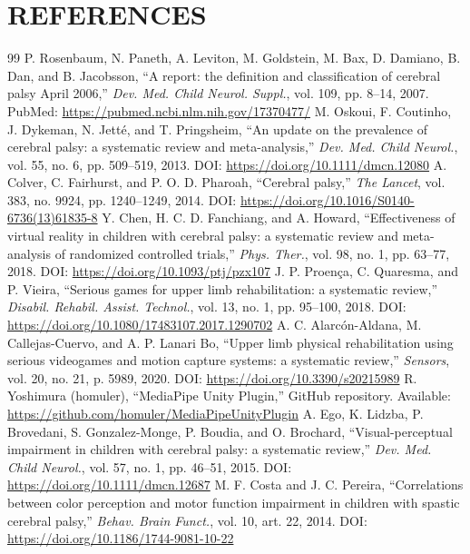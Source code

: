 \documentclass[12pt]{article}
\begin{document}
\clearpage
\section{REFERENCES}
\begin{thebibliography}{99}
 P. Rosenbaum, N. Paneth, A. Leviton, M. Goldstein, M. Bax, D. Damiano, B. Dan, and B. Jacobsson, ``A report: the definition and classification of cerebral palsy April 2006,'' \textit{Dev. Med. Child Neurol. Suppl.}, vol. 109, pp. 8--14, 2007. PubMed: \url{https://pubmed.ncbi.nlm.nih.gov/17370477/}
 M. Oskoui, F. Coutinho, J. Dykeman, N. Jett\'e, and T. Pringsheim, ``An update on the prevalence of cerebral palsy: a systematic review and meta-analysis,'' \textit{Dev. Med. Child Neurol.}, vol. 55, no. 6, pp. 509--519, 2013. DOI: \url{https://doi.org/10.1111/dmcn.12080}
 A. Colver, C. Fairhurst, and P. O. D. Pharoah, ``Cerebral palsy,'' \textit{The Lancet}, vol. 383, no. 9924, pp. 1240--1249, 2014. DOI: \url{https://doi.org/10.1016/S0140-6736(13)61835-8}
 Y. Chen, H. C. D. Fanchiang, and A. Howard, ``Effectiveness of virtual reality in children with cerebral palsy: a systematic review and meta-analysis of randomized controlled trials,'' \textit{Phys. Ther.}, vol. 98, no. 1, pp. 63--77, 2018. DOI: \url{https://doi.org/10.1093/ptj/pzx107}
 J. P. Proen\c{c}a, C. Quaresma, and P. Vieira, ``Serious games for upper limb rehabilitation: a systematic review,'' \textit{Disabil. Rehabil. Assist. Technol.}, vol. 13, no. 1, pp. 95--100, 2018. DOI: \url{https://doi.org/10.1080/17483107.2017.1290702}
 A. C. Alarc\'on-Aldana, M. Callejas-Cuervo, and A. P. Lanari Bo, ``Upper limb physical rehabilitation using serious videogames and motion capture systems: a systematic review,'' \textit{Sensors}, vol. 20, no. 21, p. 5989, 2020. DOI: \url{https://doi.org/10.3390/s20215989}
 R. Yoshimura (homuler), ``MediaPipe Unity Plugin,'' GitHub repository. Available: \url{https://github.com/homuler/MediaPipeUnityPlugin}
 A. Ego, K. Lidzba, P. Brovedani, S. Gonzalez-Monge, P. Boudia, and O. Brochard, ``Visual-perceptual impairment in children with cerebral palsy: a systematic review,'' \textit{Dev. Med. Child Neurol.}, vol. 57, no. 1, pp. 46--51, 2015. DOI: \url{https://doi.org/10.1111/dmcn.12687}
 M. F. Costa and J. C. Pereira, ``Correlations between color perception and motor function impairment in children with spastic cerebral palsy,'' \textit{Behav. Brain Funct.}, vol. 10, art. 22, 2014. DOI: \url{https://doi.org/10.1186/1744-9081-10-22}

\end{thebibliography}
\end{document}
